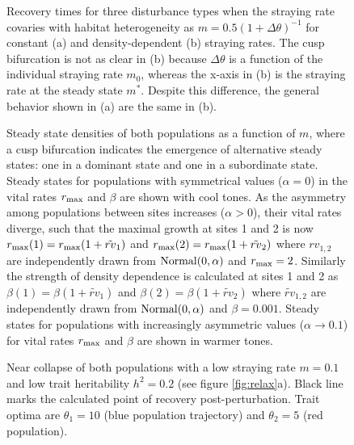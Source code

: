 \documentclass{revtex4}
\begin{document}
\begin{figure}
  \captionsetup{justification=raggedright,
singlelinecheck=false
}
  \centering
  \caption{
  Recovery times for three disturbance types when the straying rate covaries with habitat heterogeneity as $m = 0.5(1 + \Delta\theta)^{-1}$ for constant (a) and density-dependent (b) straying rates.
  The cusp bifurcation is not as clear in (b) because $\Delta\theta$ is a function of the individual straying rate $m_0$, whereas the x-axis in (b) is the straying rate at the steady state $m^*$.
  Despite this difference, the general behavior shown in (a) are the same in (b).
  } \label{fig:mthetamvm}
\end{figure}

\begin{figure}
  \captionsetup{justification=raggedright,
singlelinecheck=false
}
\centering
\caption{
Steady state densities of both populations as a function of $m$, where a cusp bifurcation indicates the emergence of alternative steady states: one in a dominant state and one in a subordinate state.
Steady states for populations with symmetrical values ($\alpha=0$) in the vital rates $r_{\rm max}$ and $\beta$ are shown with cool tones.
As the asymmetry among populations between sites increases ($\alpha>0$), their vital rates diverge, such that the maximal growth at sites 1 and 2 is now $r_{\rm max}(1)=r_{\rm max}(1+\tilde{rv}_1)$ and $r_{\rm max}(2)=r_{\rm max}(1+\tilde{rv}_2)$ where $rv_{1,2}$ are independently drawn from $\rm{Normal}(0,\alpha)$ and $r_{\rm max}=2$. 
Similarly the strength of density dependence is calculated at sites 1 and 2 as $\beta(1)=\beta(1+\tilde{rv}_1)$ and $\beta(2)=\beta(1+\tilde{rv}_2)$ where $\tilde{rv}_{1,2}$ are independently drawn from $\rm{Normal}(0,\alpha)$ and $\beta=0.001$.
Steady states for populations with increasingly asymmetric values ($\alpha\rightarrow 0.1$) for vital rates $r_{\rm max}$ and $\beta$ are shown in warmer tones.
} \label{fig:symmetry}
\end{figure}


\begin{figure}
  \captionsetup{justification=raggedright,
singlelinecheck=false
}
\centering
\caption{
Near collapse of both populations with a low straying rate $m=0.1$ and low trait heritability $h^2=0.2$ (see figure \ref{fig:relax}a).
Black line marks the calculated point of recovery post-perturbation.
Trait optima are $\theta_1 = 10$ (blue population trajectory) and $\theta_2 = 5$ (red population).
} \label{fig:relaxtraj_bothlh}
\end{figure}
\end{document}
